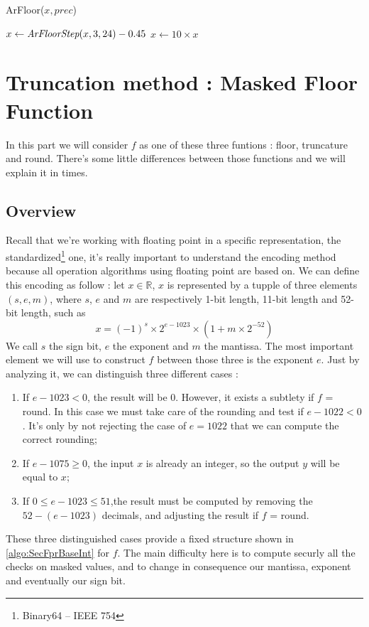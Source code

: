 \documentclass[runningheads]{llncs}
\begin{document}
\begin{algorithm}[H]
  \caption{ArFloor($x,prec$)}
  \label{alg:arfloor}
  $x\leftarrow \emph{ArFloorStep}(x,3,24) -\num{0.45}$\;
  $x \leftarrow 10 \times x$\;
\end{algorithm}

\section{Truncation method : Masked Floor Function}
In this part we will consider $f$ as one of these three funtions : floor, truncature and round. There's some little differences between those functions and we will explain it in times.

\subsection{Overview}
  Recall that we're working with floating point in a specific representation, the standardized\footnote{Binary64 -- IEEE 754} one,
    it's really important to understand the encoding method because all operation algorithms using floating point are based on. We can define this encoding as follow : 
    let $x \in \mathbb{R}$, $x$ is represented by a tupple of three elements $(s,e,m)$, where $s$, $e$ and $m$ are respectively 1-bit length, 11-bit length and 52-bit length, such as $$x= (-1)^s \times 2^{e-1023} \times (1+m\times 2^{-52})$$
    We call $s$ the sign bit, $e$ the exponent and $m$ the mantissa.%
    The most important element we will use to construct $f$ between those three is the exponent $e$. Just by analyzing it, we can distinguish three different cases :
    \begin{enumerate}
        \item If $e-1023<0$, the result will be $0$. However, it exists a subtlety if $f$ = round. In this case we must take care of the rounding and test if $e-1022<0$. It's only by not rejecting the case of $e=1022$ that we can compute the correct rounding;
        \item If $e-1075\geq0$, the input $x$ is already an integer, so the output $y$ will be equal to $x$;
        \item If $0\leq e-1023 \leq 51$,the result must be computed by removing the $52-(e-1023)$ decimals, and adjusting the result if $f$ = round. 
    \end{enumerate}
    These three distinguished cases provide a fixed structure shown in \autoref{algo:SecFprBaseInt} for $f$. The main difficulty here is to compute securly all the checks on masked values, and to change in consequence our mantissa, exponent and eventually our sign bit. 
\end{document}
